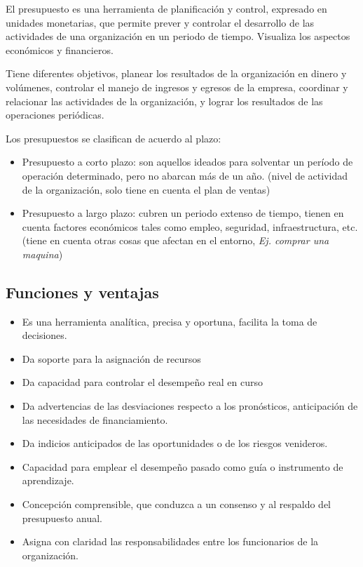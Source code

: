 \documentclass[titlepage,a4paper]{article}
\begin{document}
El presupuesto es una herramienta de planificación y control, expresado en unidades monetarias, que permite prever y controlar el desarrollo de las actividades de una organización en un periodo de tiempo. Visualiza los aspectos económicos y financieros.

Tiene diferentes objetivos, planear los resultados de la organización en dinero y volúmenes, controlar el manejo de ingresos y egresos de la empresa, coordinar y relacionar las actividades de la organización, y lograr los resultados de las operaciones periódicas.

Los presupuestos se clasifican de acuerdo al plazo:
\begin{itemize}
    \item Presupuesto a corto plazo: son aquellos ideados para solventar un período de operación determinado, pero no abarcan más de un año. (nivel de actividad de la organización, solo tiene en cuenta el plan de ventas)
    \item Presupuesto a largo plazo: cubren un periodo extenso de tiempo, tienen en cuenta factores económicos tales como empleo, seguridad, infraestructura, etc. (tiene en cuenta otras cosas que afectan en el entorno, \textit{Ej. comprar una maquina})
\end{itemize}

\subsection{Funciones y ventajas}
\begin{itemize}
    \item Es una herramienta analítica, precisa y oportuna, facilita la toma de decisiones.
    \item Da soporte para la asignación de recursos
    \item Da capacidad para controlar el desempeño real en curso
    \item Da advertencias de las desviaciones respecto a los pronósticos, anticipación de las necesidades de financiamiento.
    \item Da indicios anticipados de las oportunidades o de los riesgos venideros.
    \item Capacidad para emplear el desempeño pasado como guía o instrumento de aprendizaje.
    \item Concepción comprensible, que conduzca a un consenso y al respaldo del presupuesto anual.
    \item Asigna con claridad las responsabilidades entre los funcionarios de la organización.
\end{itemize}
\end{document}
